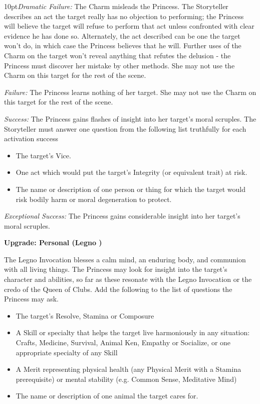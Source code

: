 \begin{myindentpar}{10pt}\emph{Dramatic Failure:} The Charm misleads the Princess. The Storyteller describes an act the target really has no objection to performing; the Princess will believe the target will refuse to perform that act unless confronted with clear evidence he has done so. Alternately, the act described can be one the target won't do, in which case the Princess believes that he will. Further uses of the Charm on the target won't reveal anything that refutes the delusion - the Princess must discover her mistake by other methods. She may not use the Charm on this target for the rest of the scene.

\emph{Failure:} The Princess learns nothing of her target. She may not use the Charm on this target for the rest of the scene.

\emph{Success:} The Princess gains flashes of insight into her target's moral scruples. The Storyteller must answer one question from the following list truthfully for each activation success

\begin{itemize}
\item The target's Vice.
\item One act which would put the target's Integrity (or equivalent trait) at risk.
\item The name or description of one person or thing for which the target would risk bodily harm or moral degeneration to protect.
\end{itemize}

\emph{Exceptional Success:} The Princess gains considerable insight into her target's moral scruples.

\textbf{Upgrade: Personal (Legno \textbullet\textbullet)}

The Legno Invocation blesses a calm mind, an enduring body, and communion with all living things. The Princess may look for insight into the target's character and abilities, so far as these resonate with the Legno Invocation or the credo of the Queen of Clubs. Add the following to the list of questions the Princess may ask.

\begin{itemize}
 \item  The target's Resolve, Stamina or Composure
\item A Skill or specialty that helps the target live harmoniously in any situation: Crafts, Medicine, Survival, Animal Ken, Empathy or Socialize, or one appropriate specialty of any Skill
\item A Merit representing physical health (any Physical Merit with a Stamina prerequisite) or mental stability (e.g. Common Sense, Meditative Mind)
\item The name or description of one animal the target cares for.\end{itemize}\end{myindentpar}


